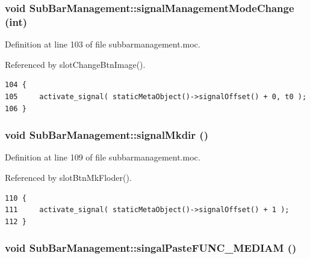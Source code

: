 \subsubsection{\setlength{\rightskip}{0pt plus 5cm}void Sub\-Bar\-Management::signal\-Management\-Mode\-Change (int)\hspace{0.3cm}{\tt  [signal]}}\label{classSubBarManagement_SubBarManagementl0}




Definition at line 103 of file subbarmanagement.moc.

Referenced by slot\-Change\-Btn\-Image().



\footnotesize\begin{verbatim}104 {
105     activate_signal( staticMetaObject()->signalOffset() + 0, t0 );
106 }
\end{verbatim}\normalsize 
{}
\subsubsection{\setlength{\rightskip}{0pt plus 5cm}void Sub\-Bar\-Management::signal\-Mkdir ()\hspace{0.3cm}{\tt  [signal]}}\label{classSubBarManagement_SubBarManagementl1}




Definition at line 109 of file subbarmanagement.moc.

Referenced by slot\-Btn\-Mk\-Floder().



\footnotesize\begin{verbatim}110 {
111     activate_signal( staticMetaObject()->signalOffset() + 1 );
112 }
\end{verbatim}\normalsize 
{}
\subsubsection{\setlength{\rightskip}{0pt plus 5cm}void Sub\-Bar\-Management::singal\-Paste\-FUNC\_\-MEDIAM ()\hspace{0.3cm}{\tt  [signal]}}\label{classSubBarManagement_SubBarManagementl2}




